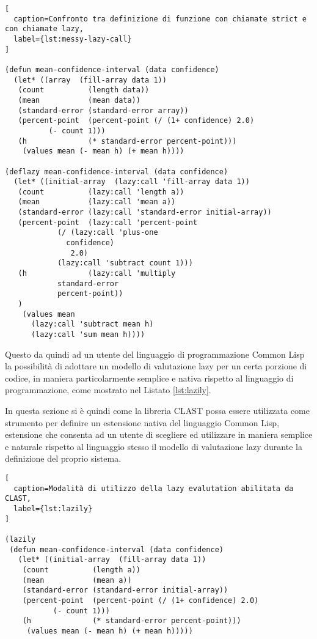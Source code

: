 \begin{lstlisting}[
  caption=Confronto tra definizione di funzione con chiamate strict e con chiamate lazy,
  label={lst:messy-lazy-call}
]

(defun mean-confidence-interval (data confidence)
  (let* ((array  (fill-array data 1))
   (count          (length data))
   (mean           (mean data))
   (standard-error (standard-error array))
   (percent-point  (percent-point (/ (1+ confidence) 2.0)
          (- count 1)))
   (h              (* standard-error percent-point)))
    (values mean (- mean h) (+ mean h))))

(deflazy mean-confidence-interval (data confidence)
  (let* ((initial-array  (lazy:call 'fill-array data 1))
   (count          (lazy:call 'length a))
   (mean           (lazy:call 'mean a))
   (standard-error (lazy:call 'standard-error initial-array))
   (percent-point  (lazy:call 'percent-point
            (/ (lazy:call 'plus-one
              confidence)
               2.0)
            (lazy:call 'subtract count 1)))
   (h              (lazy:call 'multiply
            standard-error
            percent-point))
   )
    (values mean
      (lazy:call 'subtract mean h)
      (lazy:call 'sum mean h))))

\end{lstlisting}

Questo da quindi ad un utente del linguaggio di programmazione Common Lisp la
possibilità di adottare un modello di valutazione lazy per un certa porzione di
codice, in maniera particolarmente semplice e nativa rispetto al linguaggio di
programmazione, come mostrato nel Listato \ref{lst:lazily}.

In questa sezione si è quindi come la libreria CLAST possa essere utilizzata
come strumento per definire un estensione nativa del linguaggio Common Lisp,
estensione che consenta ad un utente di scegliere ed utilizzare in maniera
semplice e naturale rispetto al linguaggio stesso il modello di valutazione lazy
durante la definizione del proprio sistema.

\begin{lstlisting}[
  caption=Modalità di utilizzo della lazy evalutation abilitata da CLAST,
  label={lst:lazily}
]

(lazily
 (defun mean-confidence-interval (data confidence)
   (let* ((initial-array  (fill-array data 1))
    (count          (length a))
    (mean           (mean a))
    (standard-error (standard-error initial-array))
    (percent-point  (percent-point (/ (1+ confidence) 2.0)
           (- count 1)))
    (h              (* standard-error percent-point)))
     (values mean (- mean h) (+ mean h)))))

\end{lstlisting}
